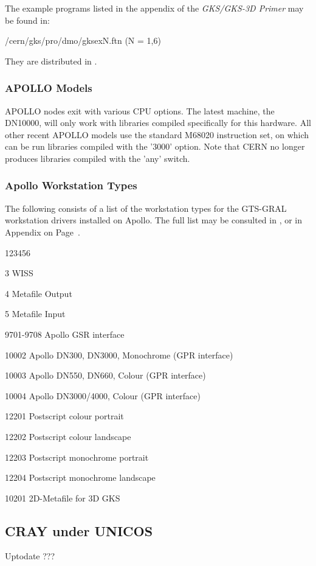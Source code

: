 The example programs listed in the appendix of the
{\it GKS/GKS-3D Primer} may be found in:
\begin{XMP}
/cern/gks/pro/dmo/gksexN.ftn (N = 1,6)
\end{XMP}
They are distributed in .
\subsubsection{APOLLO Models}
 
APOLLO nodes exit with various CPU options. The latest machine, the DN10000,
will only work with libraries compiled specifically for this hardware.
All other recent APOLLO models use the standard M68020 instruction set,
on which can be run libraries compiled with the '3000' option.
Note that CERN no longer produces libraries compiled with the 'any' switch.
\subsubsection{Apollo Workstation Types}
 
The following consists of a list of the workstation types for
the GTS-GRAL workstation drivers installed on Apollo.
The full list may be consulted in , or in
Appendix on Page~\pageref{sec:gtstyp}.
\begin{DLtt}{123456}
\item[3]WISS
\item[4]Metafile Output
\item[5]Metafile Input
\item[9701-9708]Apollo GSR interface
\item[10002]Apollo DN300, DN3000, Monochrome (GPR interface)
\item[10003]Apollo DN550, DN660, Colour (GPR interface)
\item[10004]Apollo DN3000/4000, Colour (GPR interface)
\item[12201]Postscript colour portrait
\item[12202]Postscript colour landscape
\item[12203]Postscript monochrome portrait
\item[12204]Postscript monochrome landscape
\item[10201]2D-Metafile for 3D GKS
\end{DLtt}
\subsection{CRAY under UNICOS}
\Lit{$==>$} Uptodate ???
 
